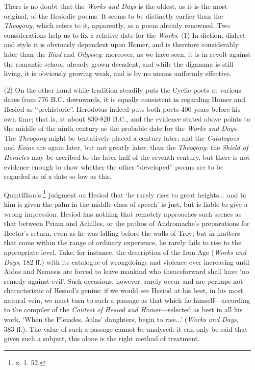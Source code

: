 
There is no doubt that the \emph{Works and Days} is the oldest, as it is the
most original, of the Hesiodic poems. It seems to be distinctly earlier than
the \emph{Theogony}, which refers to it, apparently, as a poem already
renowned. Two considerations help us to fix a relative date for the
\emph{Works}. (1) In diction, dialect and style it is obviously dependent upon
Homer, and is therefore considerably later than the \emph{Iliad} and
\emph{Odyssey}: moreover, as we have seen, it is in revolt against the romantic
school, already grown decadent, and while the digamma is still living, it is
obviously growing weak, and is by no means uniformly effective.

(2) On the other hand while tradition steadily puts the Cyclic poets at various
dates from 776 B.C. downwards, it is equally consistent in regarding Homer and
Hesiod as “prehistoric”. Herodotus indeed puts both poets 400 years
before his own time; that is, at about 830-820 B.C., and the evidence stated
above points to the middle of the ninth century as the probable date for the
\emph{Works and Days}. The \emph{Theogony} might be tentatively placed a
century later; and the \emph{Catalogues} and \emph{Eoiae} are again later, but
not greatly later, than the \emph{Theogony}: the \emph{Shield of Heracles} may
be ascribed to the later half of the seventh century, but there is not evidence
enough to show whether the other “developed” poems are to be
regarded as of a date so low as this.


Quintillian’s \footnote{x. 1. 52.} judgment on Hesiod that ‘he
rarely rises to great heights... and to him is given the palm in the
middle-class of speech’ is just, but is liable to give a wrong
impression. Hesiod has nothing that remotely approaches such scenes as that
between Priam and Achilles, or the pathos of Andromache’s preparations
for Hector’s return, even as he was falling before the walls of Troy; but
in matters that come within the range of ordinary experience, he rarely fails
to rise to the appropriate level. Take, for instance, the description of the
Iron Age (\emph{Works and Days}, 182 ff.) with its catalogue of wrongdoings and
violence ever increasing until Aidos and Nemesis are forced to leave mankind
who thenceforward shall have ‘no remedy against evil’. Such
occasions, however, rarely occur and are perhaps not characteristic of
Hesiod’s genius: if we would see Hesiod at his best, in his most natural
vein, we must turn to such a passage as that which he himself—according
to the compiler of the \emph{Contest of Hesiod and Homer}—selected as
best in all his work, ‘When the Pleiades, Atlas’ daughters, begin
to rise...’ (\emph{Works and Days}, 383 ff.). The value of such a passage
cannot be analysed: it can only be said that given such a subject, this alone
is the right method of treatment.

